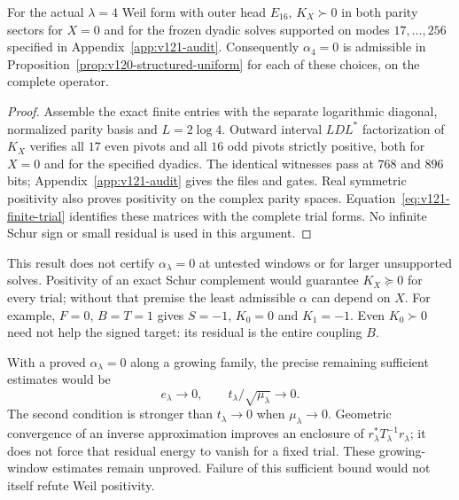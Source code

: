 \begin{proposition}
\label{prop:v121-alpha-zero}
For the actual $\lambda=4$ Weil form with outer head $E_{16}$,
$K_X\succ0$ in both parity sectors for $X=0$ and for the frozen
dyadic solves supported on modes $17,\ldots,256$ specified in
Appendix~\ref{app:v121-audit}. Consequently $\alpha_4=0$ is
admissible in Proposition~\ref{prop:v120-structured-uniform} for
each of these choices, on the complete operator.
\end{proposition}
\begin{proof}
Assemble the exact finite entries with the separate logarithmic
diagonal, normalized parity basis and $L=2\log4$. Outward interval
$LDL^*$ factorization of $K_X$ verifies all $17$ even pivots and
all $16$ odd pivots strictly positive, both for $X=0$ and for the
specified dyadics. The identical witnesses pass at $768$ and $896$
bits; Appendix~\ref{app:v121-audit} gives the files and gates.
Real symmetric positivity also proves positivity on the complex
parity spaces. Equation~\eqref{eq:v121-finite-trial} identifies these
matrices with the complete trial forms. No infinite Schur sign or
small residual is used in this argument.
\end{proof}

This result does not certify $\alpha_\lambda=0$ at untested windows
or for larger unsupported solves. Positivity of an exact Schur
complement would guarantee $K_X\succeq0$ for every trial; without
that premise the least admissible $\alpha$ can depend on $X$.
For example, $F=0$, $B=T=1$ gives $S=-1$, $K_0=0$ and $K_1=-1$.
Even $K_0\succ0$ need not help the signed target: its residual is
the entire coupling $B$.

With a proved $\alpha_\lambda=0$ along a growing family, the precise
remaining sufficient estimates would be
\begin{equation}\label{eq:v121-scaled-target}
 e_\lambda\longrightarrow0,
 \qquad t_\lambda/\sqrt{\mu_\lambda}\longrightarrow0.
\end{equation}
The second condition is stronger than $t_\lambda\to0$ when
$\mu_\lambda\to0$. Geometric convergence of an inverse approximation
improves an enclosure of $r_\lambda^*T_\lambda^{-1}r_\lambda$;
it does not force that residual energy to vanish for a fixed trial.
These growing-window estimates remain unproved. Failure of this
sufficient bound would not itself refute Weil positivity.


